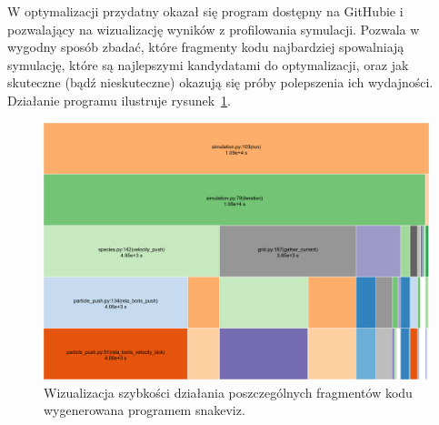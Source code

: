 W optymalizacji przydatny okazał się program \cite{snakeviz} dostępny na
GitHubie i pozwalający na wizualizację wyników z profilowania
symulacji. Pozwala w wygodny sposób zbadać, które fragmenty kodu najbardziej
spowalniają symulację, które są najlepszymi kandydatami do optymalizacji, oraz
jak skuteczne (bądź nieskuteczne) okazują się próby polepszenia ich wydajności.
Działanie programu ilustruje rysunek~\ref{fig:snakeviz}.
\begin{figure}[h!]
  \includegraphics[width=\textwidth]{Images/snakeviz}
  \caption{Wizualizacja szybkości działania poszczególnych fragmentów kodu
    wygenerowana programem snakeviz.}
  \label{fig:snakeviz}
\end{figure}
